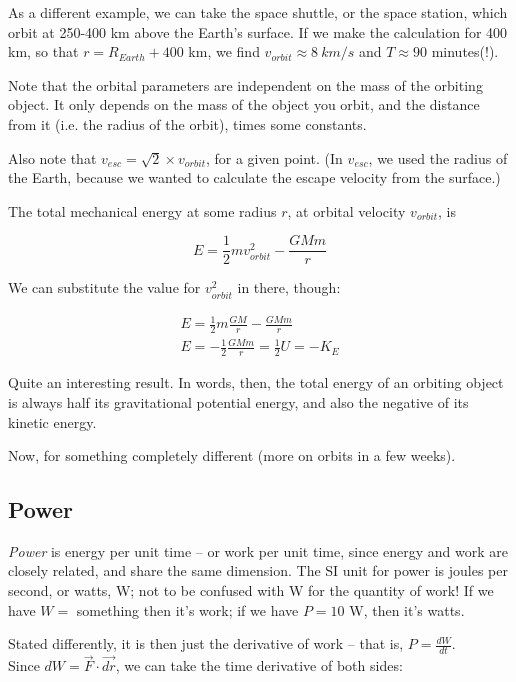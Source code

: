 \documentclass[12pt,a4paper]{report}
\begin{document}
As a different example, we can take the space shuttle, or the space station, which orbit at 250-400 km above the Earth's surface. If we make the calculation for 400 km, so that $r = R_{Earth} + 400$ km, we find $v_{orbit} \approx \SI{8}{km/s}$ and $T \approx 90$ minutes(!).

Note that the orbital parameters are independent on the mass of the orbiting object. It only depends on the mass of the object you orbit, and the distance from it (i.e. the radius of the orbit), times some constants.

Also note that $v_{esc} = \sqrt{2} \times v_{orbit}$, for a given point. (In $v_{esc}$, we used the radius of the Earth, because we wanted to calculate the escape velocity from the surface.)

The total mechanical energy at some radius $r$, at orbital velocity $v_{orbit}$, is

\begin{equation}
E = \frac{1}{2} m v_{orbit}^2 - \frac{G M m}{r}
\end{equation}

We can substitute the value for $v_{orbit}^2$ in there, though:

\begin{align}
E = \frac{1}{2} m \frac{G M}{r} - \frac{G M m}{r}\\
E = -\frac{1}{2} \frac{G M m}{r} = \frac{1}{2} U = - K_E
\end{align}

Quite an interesting result. In words, then, the total energy of an orbiting object is always half its gravitational potential energy, and also the negative of its kinetic energy.

Now, for something completely different (more on orbits in a few weeks).

\subsection{Power}

\emph{Power} is energy per unit time -- or work per unit time, since energy and work are closely related, and share the same dimension. The SI unit for power is joules per second, or watts, W; not to be confused with W for the quantity of work! If we have $W = $ something then it's work; if we have $P = 10$ W, then it's watts.

Stated differently, it is then just the derivative of work -- that is, $P = \displaystyle \frac{dW}{dt}$.\\
Since $dW = \vec{F} \cdot \vec{dr}$, we can take the time derivative of both sides:
\end{document}
